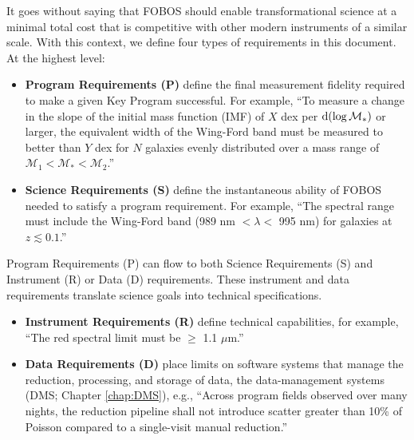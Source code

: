 \documentclass[11pt,a4paper,twoside,onecolumn,openany,final,oldfontcommands]{memoir}
\begin{document}
It goes without saying that FOBOS should enable transformational science at a minimal total cost that is competitive with other modern instruments of a similar scale. With this context, we define four types of requirements in this document.  At the highest level:

\begin{itemize}
\item \textbf{Program Requirements (P)} define the final measurement fidelity required to make a given Key Program successful. For example, ``To measure a change in the slope of the initial mass function (IMF) of $X$ dex per ${\rm d}(\log\mathcal{M}_\ast)$ or larger, the equivalent width of the Wing-Ford band must be measured to better than $Y$ dex for $N$ galaxies evenly distributed over a mass range of $\mathcal{M}_1 < \mathcal{M}_\ast < \mathcal{M}_2$.''  

\item \textbf{Science Requirements (S)} define the instantaneous ability of FOBOS needed to satisfy a program requirement.  For example, ``The spectral range must include the Wing-Ford band (989 nm $< \lambda <$ 995 nm) for galaxies at $z \lesssim 0.1$.''  
\end{itemize}

Program Requirements (P) can flow to both Science Requirements (S) and Instrument (R) or Data (D) requirements.  These instrument and data requirements translate science goals into technical specifications.


\begin{itemize}
\item \textbf{Instrument Requirements (R)} define technical capabilities, for example, ``The red spectral limit must be $\geq$ 1.1 $\mu$m.'' 

\item \textbf{Data Requirements (D)} place limits on software systems that manage the reduction, processing, and storage of data, the data-management systems (DMS; Chapter \ref{chap:DMS}), e.g., ``Across program fields observed over many nights, the reduction pipeline shall not introduce scatter greater than 10\% of Poisson compared to a single-visit manual reduction.'' 
\end{itemize}
\end{document}
